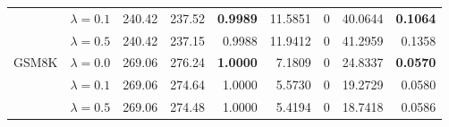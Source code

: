 \begin{table}[t]
{\begin{tabular}{l l rrrrrrr}
 & $\lambda{=}0.1$ & 240.42 & 237.52 & \textbf{0.9989} & 11.5851 & \cellcolor{cyan!12} $0$ & 40.0644 & \textbf{0.1064} \\
 & $\lambda{=}0.5$ & 240.42 & 237.15 & 0.9988 & 11.9412 & \cellcolor{cyan!12} $0$ & 41.2959 & 0.1358 \\
\midrule
GSM8K & $\lambda{=}0.0$ & 269.06 & 276.24 & \textbf{1.0000} & 7.1809 & \cellcolor{cyan!12} $0$ & 24.8337 & \textbf{0.0570} \\
 & $\lambda{=}0.1$ & 269.06 & 274.64 & 1.0000 & 5.5730 & \cellcolor{cyan!12} $0$ & 19.2729 & 0.0580 \\
 & $\lambda{=}0.5$ & 269.06 & 274.48 & 1.0000 & 5.4194 & \cellcolor{cyan!12} $0$ & 18.7418 & 0.0586 \\
\bottomrule
\end{tabular}}
\end{table}